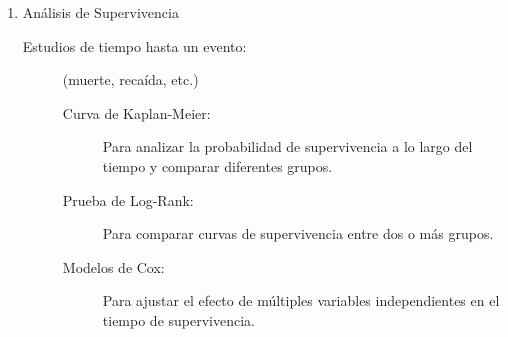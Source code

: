 \documentclass[12pt,letterpaper,spanish, twoside]{article}
\begin{document}
\begin{enumerate}
    \item Análisis de Supervivencia
    \begin{description}
        \item[Estudios de tiempo hasta un evento:] (muerte, recaída, etc.)
            \begin{description}
                \item[Curva de Kaplan-Meier:] Para analizar la probabilidad de supervivencia a lo largo del tiempo y comparar diferentes grupos.
                \item[Prueba de Log-Rank:] Para comparar curvas de supervivencia entre dos o más grupos.
                \item[Modelos de Cox:] Para ajustar el efecto de múltiples variables independientes en el tiempo de supervivencia.
            \end{description}
    \end{description}
\end{enumerate}
\end{document}
